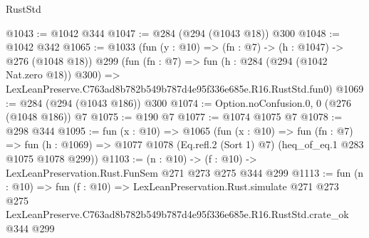 \begin{lexlean}{RustStd}
\begin{coremodule}
@1043 := @1042 @344
@1047 := @284 (@294 (@1043 @18)) @300
@1048 := @1042 @342
@1065 := @1033
    (fun (y : @10) => (fn : @7) -> (h : @1047) -> @276 (@1048 @18))
    @299
    (fun (fn : @7) =>
    fun (h : @284 (@294 (@1042 Nat.zero @18)) @300) =>
    LexLeanPreserve.C763ad8b782b549b787d4e95f336e685e.R16.RustStd.fun0)
@1069 := @284 (@294 (@1043 @186)) @300
@1074 := Option.noConfusion.{0, 0} (@276 (@1048 @186)) @7
@1075 := @190 @7
@1077 := @1074 @1075 @7
@1078 := @298 @344
@1095 := fun (x : @10) =>
  @1065
    (fun (x : @10) =>
    fun (fn : @7) =>
    fun (h : @1069) => @1077 @1078 (Eq.refl.{2} (Sort 1) @7) (heq_of_eq.{1} @283 @1075 @1078 @299))
@1103 := (n : @10) -> (f : @10) -> LexLeanPreservation.Rust.FunSem @271 @273 @275 @344 @299
@1113 := fun (n : @10) =>
  fun (f : @10) =>
  LexLeanPreservation.Rust.simulate
    @271
    @273
    @275
    LexLeanPreserve.C763ad8b782b549b787d4e95f336e685e.R16.RustStd.crate_ok
    @344
    @299
\end{coremodule}
\end{lexlean}
